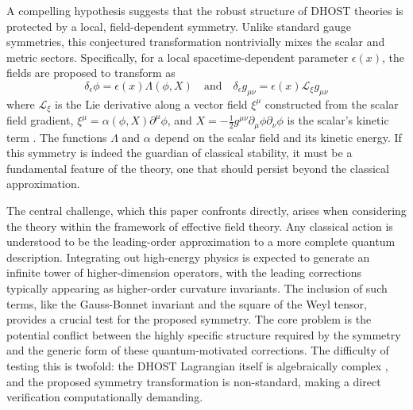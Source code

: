 \documentclass[twocolumn]{aastex631}
\begin{document}
A compelling hypothesis suggests that the robust structure of DHOST theories is protected by a local, field-dependent symmetry. Unlike standard gauge symmetries, this conjectured transformation nontrivially mixes the scalar and metric sectors. Specifically, for a local spacetime-dependent parameter $\epsilon(x)$, the fields are proposed to transform as
\begin{equation}
\delta_\epsilon \phi = \epsilon(x) \Lambda(\phi, X) \quad \text{and} \quad \delta_\epsilon g_{\mu\nu} = \epsilon(x) \mathcal{L}_{\xi} g_{\mu\nu}
\end{equation}
\citep{popławski2024classicalphysicsspacetimefields,kolev2024objectiveratescovariantderivatives}
where $\mathcal{L}_{\xi}$ is the Lie derivative along a vector field $\xi^\mu$ constructed from the scalar field gradient, $\xi^\mu = \alpha(\phi, X)\partial^\mu\phi$, and $X = -\frac{1}{2}g^{\mu\nu}\partial_\mu\phi\partial_\nu\phi$ is the scalar's kinetic term  \citep{gao2019higherderivativescalartensortheory,apostolopoulos2023constructingfamilyconformallyflat}. The functions $\Lambda$ and $\alpha$ depend on the scalar field and its kinetic energy. If this symmetry is indeed the guardian of classical stability, it must be a fundamental feature of the theory, one that should persist beyond the classical approximation.

The central challenge, which this paper confronts directly, arises when considering the theory within the framework of effective field theory. Any classical action is understood to be the leading-order approximation to a more complete quantum description. Integrating out high-energy physics is expected to generate an infinite tower of higher-dimension operators, with the leading corrections typically appearing as higher-order curvature invariants. The inclusion of such terms, like the Gauss-Bonnet invariant and the square of the Weyl tensor, provides a crucial test for the proposed symmetry. The core problem is the potential conflict between the highly specific structure required by the symmetry and the generic form of these quantum-motivated corrections. The difficulty of testing this is twofold: the DHOST Lagrangian itself is algebraically complex \citep{langlois2018degeneratehigherorderscalartensordhost}, and the proposed symmetry transformation is non-standard, making a direct verification computationally demanding.
\end{document}
